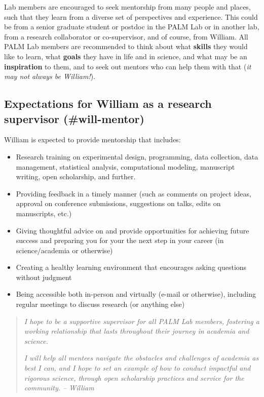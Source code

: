 \documentclass[
]{book}
\providecommand{\tightlist}{%
  \setlength{\itemsep}{0pt}\setlength{\parskip}{0pt}}
\begin{document}
Lab members are encouraged to seek mentorship from many people and places, such that they learn from a diverse set of perspectives and experience. This could be from a senior graduate student or postdoc in the PALM Lab or in another lab, from a research collaborator or co-supervisor, and of course, from William. All PALM Lab members are recommended to think about what \textbf{skills} they would like to learn, what \textbf{goals} they have in life and in science, and what may be an \textbf{inspiration} to them, and to seek out mentors who can help them with that (\emph{it may not always be William!}).

\hypertarget{expectations-for-william-as-a-research-supervisor-will-mentor}{%
\subsection{Expectations for William as a research supervisor (\#will-mentor)}\label{expectations-for-william-as-a-research-supervisor-will-mentor}}

William is expected to provide mentorship that includes:

\begin{itemize}
\tightlist
\item
  Research training on experimental design, programming, data collection, data management, statistical analysis, computational modeling, manuscript writing, open scholarship, and further.
\item
  Providing feedback in a timely manner (such as comments on project ideas, approval on conference submissions, suggestions on talks, edits on manuscripts, etc.)
\item
  Giving thoughtful advice on and provide opportunities for achieving future success and preparing you for your the next step in your career (in science/academia or otherwise)
\item
  Creating a healthy learning environment that encourages asking questions without judgment
\item
  Being accessible both in-person and virtually (e-mail or otherwise), including regular meetings to discuss research (or anything else)
\end{itemize}

\begin{quote}
\emph{I hope to be a supportive supervisor for all PALM Lab members, fostering a working relationship that lasts throughout their journey in academia and science.}

\emph{I will help all mentees navigate the obstacles and challenges of academia as best I can, and I hope to set an example of how to conduct impactful and rigorous science, through open scholarship practices and service for the community. -- William}
\end{quote}
\end{document}
